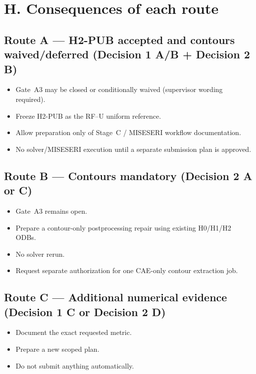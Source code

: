 \documentclass[11pt,a4paper]{article}
\begin{document}
\section*{H. Consequences of each route}

\subsection*{Route A --- H2-PUB accepted and contours waived/deferred (Decision 1 A/B + Decision 2 B)}
\begin{itemize}
  \item Gate~A3 may be closed or conditionally waived (supervisor wording required).
  \item Freeze H2-PUB as the RF--U uniform reference.
  \item Allow preparation only of Stage~C / MISESERI workflow documentation.
  \item No solver/MISESERI execution until a separate submission plan is approved.
\end{itemize}

\subsection*{Route B --- Contours mandatory (Decision 2 A or C)}
\begin{itemize}
  \item Gate~A3 remains open.
  \item Prepare a contour-only postprocessing repair using existing H0/H1/H2 ODBs.
  \item No solver rerun.
  \item Request separate authorization for one CAE-only contour extraction job.
\end{itemize}

\subsection*{Route C --- Additional numerical evidence (Decision 1 C or Decision 2 D)}
\begin{itemize}
  \item Document the exact requested metric.
  \item Prepare a new scoped plan.
  \item Do not submit anything automatically.
\end{itemize}
\end{document}
